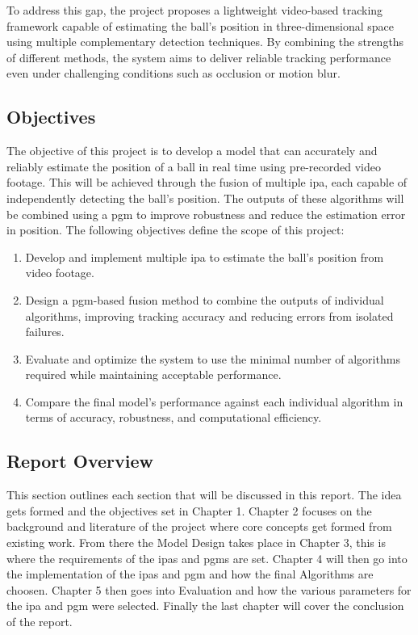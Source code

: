 \documentclass[12pt,a4paper]{article}
\begin{document}
To address this gap, the project proposes a lightweight video-based tracking framework capable of estimating the ball’s position in three-dimensional space using multiple complementary detection techniques. By combining the strengths of different methods, the system aims to deliver reliable tracking performance even under challenging conditions such as occlusion or motion blur.

\subsection{Objectives}
The objective of this project is to develop a model that can accurately and reliably estimate the position of a ball in real time using pre-recorded video footage. This will be achieved through the fusion of multiple \acs{ipa}, each capable of independently detecting the ball's position. The outputs of these algorithms will be combined using a \acs{pgm} to improve robustness and reduce the estimation error in position. The following objectives define the scope of this project:

\begin{enumerate}
	\item Develop and implement multiple \acs{ipa} to estimate the ball’s position from video footage.
	\item Design a \acs{pgm}-based fusion method to combine the outputs of individual algorithms, improving tracking accuracy and reducing errors from isolated failures.
	\item Evaluate and optimize the system to use the minimal number of algorithms required while maintaining acceptable performance.
	\item Compare the final model’s performance against each individual algorithm in terms of accuracy, robustness, and computational efficiency.
\end{enumerate}

\subsection{Report Overview}
This section outlines each section that will be discussed in this report. The idea gets formed and the objectives set in Chapter 1. Chapter 2 focuses on the background and literature of the project where core concepts get formed from existing work. From there the Model Design takes place in Chapter 3, this is where the requirements of the \acs{ipa}s and \acs{pgm}s are set. Chapter 4 will then go into the implementation of the \acs{ipa}s and \acs{pgm} and how the final Algorithms are choosen. Chapter 5 then goes into Evaluation and how the various parameters for the \acs{ipa} and \acs{pgm} were selected. Finally the last chapter will cover the conclusion of the report.
\end{document}

